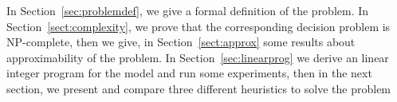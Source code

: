 In Section~\ref{sec:problemdef}, we give a formal definition of the problem. In Section~\ref{sect:complexity}, we prove that the corresponding decision problem is NP-complete, then we give, in Section~\ref{sect:approx} some results about approximability of the problem. In Section~\ref{sec:linearprog} we derive an linear integer program for the model and run some experiments, then in the next section, we present and compare three different heuristics to solve the problem
